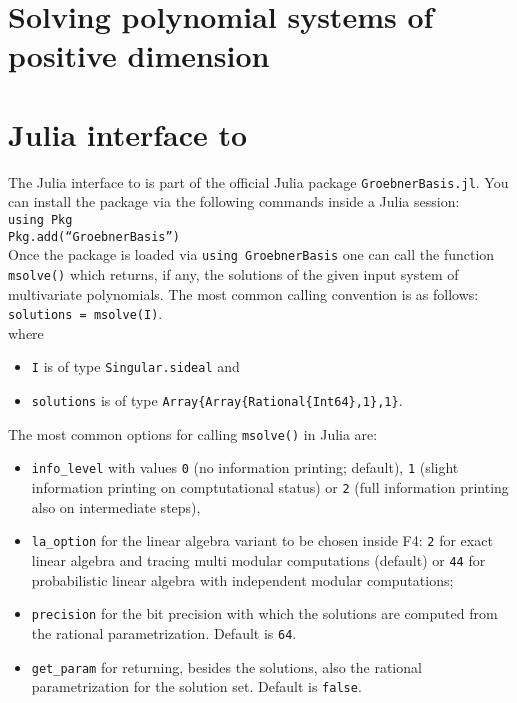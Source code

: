 \documentclass[a4paper,english,11pt]{scrartcl}
\theoremstyle{definition}
\theoremstyle{remark}
\begin{document}
\section{Solving polynomial systems of positive dimension}\label{sec:posdim}

\section{Julia interface to \msolve}
The Julia interface to \msolve is part of the official Julia package
\texttt{GroebnerBasis.jl}. You can install the package via the following
commands inside a Julia session:\\[1em]
\texttt{using Pkg\\
Pkg.add(“GroebnerBasis”)}\\[1em]
Once the package is loaded via \texttt{using GroebnerBasis} one can call the function
\texttt{msolve()} which returns, if any, the solutions of the given input
system of multivariate polynomials. The most common calling convention is as follows:\\[1em]
\texttt{solutions = msolve(I)}.\\[1em]
where
\begin{itemize}
    \item \texttt{I} is of type \texttt{Singular.sideal} and
    \item \texttt{solutions} is of type \texttt{Array\{Array\{Rational\{Int64\},1\},1\}}.
\end{itemize}
The most common options for calling \texttt{msolve()} in Julia are:
\begin{itemize}
    \item \texttt{info\_level} with values \texttt{0} (no information printing;
        default), \texttt{1} (slight information printing on comptutational
        status) or \texttt{2} (full information printing also on intermediate
        steps),
    \item \texttt{la\_option} for the linear algebra variant to be chosen inside
        F4: \texttt{2} for exact linear algebra and tracing multi modular
        computations (default) or \texttt{44} for probabilistic linear algebra
        with independent modular computations;
    \item \texttt{precision} for the bit precision with which the solutions are
        computed from the rational parametrization. Default is \texttt{64}.
    \item \texttt{get\_param} for returning, besides the solutions, also the
        rational parametrization for the solution set. Default is
        \texttt{false}.
\end{itemize}
\end{document}
